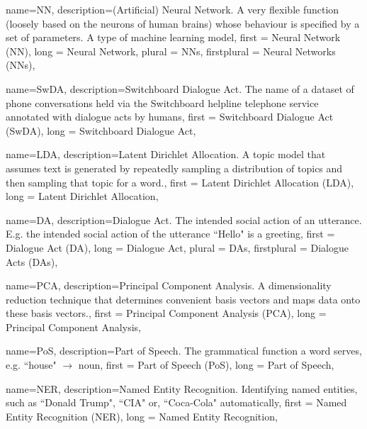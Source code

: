 {
        name=NN,
        description={(Artificial) Neural Network. A very flexible function (loosely based on the neurons of human brains) whose behaviour is specified by a set of parameters. A type of machine learning model},
        first = {Neural Network (NN)},
        long = {Neural Network},
        plural = {NNs},
        firstplural = {Neural Networks (NNs)},
}

{
        name=SwDA,
        description={Switchboard Dialogue Act. The name of a dataset of phone conversations held via the Switchboard helpline telephone service annotated with dialogue acts by humans},
        first = {Switchboard Dialogue Act (SwDA)},
        long = {Switchboard Dialogue Act},
}

{
        name=LDA,
        description={Latent Dirichlet Allocation. A topic model that assumes text is generated by repeatedly sampling a distribution of topics and then sampling that topic for a word.},
        first = {Latent Dirichlet Allocation (LDA)},
        long = {Latent Dirichlet Allocation},
}

{
        name=DA,
        description={Dialogue Act. The intended social action of an utterance. E.g. the intended social action of the utterance ``Hello" is a greeting},
        first = {Dialogue Act (DA)},
        long = {Dialogue Act},
        plural = {DAs},
        firstplural = {Dialogue Acts (DAs)},
}

{
        name=PCA,
        description={Principal Component Analysis. A dimensionality reduction technique that determines convenient basis vectors and maps data onto these basis vectors.},
        first = {Principal Component Analysis (PCA)},
        long = {Principal Component Analysis},
}

{
        name=PoS,
        description={Part of Speech. The grammatical function a word serves, e.g. ``house" $\rightarrow$ noun},
        first = {Part of Speech (PoS)},
        long = {Part of Speech},
}

{
        name=NER,
        description={Named Entity Recognition. Identifying named entities, such as ``Donald Trump", ``CIA" or, ``Coca-Cola" automatically},
        first = {Named Entity Recognition (NER)},
        long = {Named Entity Recognition},
}



